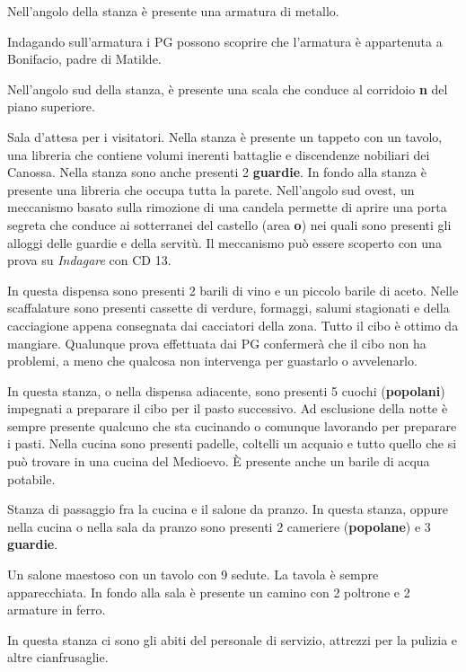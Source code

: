 \documentclass[letterpaper,twocolumn,openany,nodeprecatedcode]{dndbook}
\begin{document}
Nell'angolo della stanza è presente una armatura di metallo.

Indagando sull'armatura i PG possono scoprire che l'armatura è appartenuta a Bonifacio, padre di Matilde.

Nell'angolo sud della stanza, è presente una scala che conduce al corridoio \textbf{n} del piano superiore.

Sala d'attesa per i visitatori. Nella stanza è presente un tappeto con un tavolo, una libreria che contiene volumi inerenti battaglie e discendenze nobiliari dei Canossa.
Nella stanza sono anche presenti 2 \textbf{guardie}. In fondo alla stanza è presente una libreria che occupa tutta la parete. Nell'angolo sud ovest, un meccanismo basato sulla rimozione di una candela permette di aprire una porta segreta che conduce ai sotterranei del castello (area \textbf{o}) nei quali sono presenti gli alloggi delle guardie e della servitù. Il meccanismo può essere scoperto con una prova su \textit{Indagare} con CD 13.

In questa dispensa sono presenti 2 barili di vino e un piccolo barile di aceto. Nelle scaffalature sono presenti cassette di verdure, formaggi, salumi stagionati e della cacciagione appena consegnata dai cacciatori della zona. Tutto il cibo è ottimo da mangiare. Qualunque prova effettuata dai PG confermerà che il cibo non ha problemi, a meno che qualcosa non intervenga per guastarlo o avvelenarlo.

In questa stanza, o nella dispensa adiacente, sono presenti 5 cuochi (\textbf{popolani}) impegnati a preparare il cibo per il pasto successivo. Ad esclusione della notte è sempre presente qualcuno che sta cucinando o comunque lavorando per preparare i pasti. Nella cucina sono presenti padelle, coltelli un acquaio e tutto quello che si può trovare in una cucina del Medioevo. È presente anche un barile di acqua potabile.

Stanza di passaggio fra la cucina e il salone da pranzo. In questa stanza, oppure nella cucina o nella sala da pranzo sono presenti 2 cameriere (\textbf{popolane}) e 3 \textbf{guardie}.

Un salone maestoso con un tavolo con 9 sedute. La tavola è sempre apparecchiata. In fondo alla sala è presente un camino con 2 poltrone e 2 armature in ferro.

In questa stanza ci sono gli abiti del personale di servizio, attrezzi per la pulizia e altre cianfrusaglie.
\end{document}
